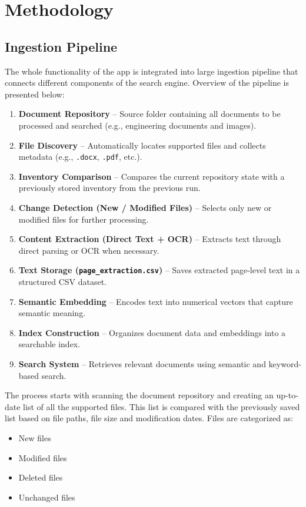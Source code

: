 \section{Methodology}
\label{sec:methods}

\subsection{Ingestion Pipeline}
The whole functionality of the app is integrated into large ingestion pipeline that connects different components of the search engine. Overview of the pipeline is presented below:
\begin{enumerate}
    \item \textbf{Document Repository} -- Source folder containing all documents to be processed and searched (e.g., engineering documents and images).
    \item \textbf{File Discovery} -- Automatically locates supported files and collects metadata (e.g., \texttt{.docx}, \texttt{.pdf}, etc.).
    \item \textbf{Inventory Comparison} -- Compares the current repository state with a previously stored inventory from the previous run.
    \item \textbf{Change Detection (New / Modified Files)} -- Selects only new or modified files for further processing.
    \item \textbf{Content Extraction (Direct Text + OCR)} -- Extracts text through direct parsing or OCR when necessary.
    \item \textbf{Text Storage (\texttt{page\_extraction.csv})} -- Saves extracted page-level text in a structured CSV dataset.
    \item \textbf{Semantic Embedding} -- Encodes text into numerical vectors that capture semantic meaning.
    \item \textbf{Index Construction} -- Organizes document data and embeddings into a searchable index.
    \item \textbf{Search System} -- Retrieves relevant documents using semantic and keyword-based search.
\end{enumerate}

The process starts with scanning the document repository and creating an up-to-date list of all the supported files. This list is compared with the previously saved list based on file paths, file size and modification dates. Files are categorized as:
\begin{itemize}
    \item New files
    \item Modified files
    \item Deleted files
    \item Unchanged files
\end{itemize}

